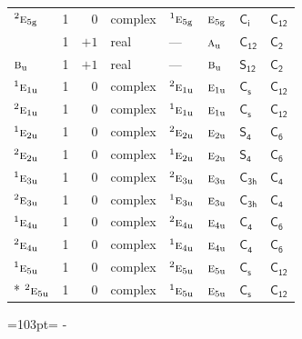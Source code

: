 \documentclass[10pt,a4paper]{article}
\newcommand{\needspace}[1]{\par\penalty-100\begingroup\dimen0=#1\relax\dimen2=\pagegoal
  \advance\dimen2-\pagetotal\ifdim\dimen0>\dimen2\relax\ifdim\dimen2>0pt\vfil\break\fi\fi
  \endgroup}
\numberwithin{equation}{section}
\newcommand{\grp}[1]{\mathsf{#1}}
\newcommand{\irr}[1]{\text{\normalfont\scshape #1}}
\newcommand{\conjpair}[1]{{}^{#1}}
\newcommand{\detbox}[1]{{\setlength{\fboxsep}{1pt}\fbox{#1}}}
\newcommand{\ptag}[1]{\mathrm{#1}}
\begin{document}
{\begin{longtable}{@{}lrrlllll@{}}
$\conjpair{2}\irr{e}_{5\ptag{g}}$ & 1 & $0$ & complex & $\conjpair{1}\irr{e}_{5\ptag{g}}$ & $\irr{e}_{5\ptag{g}}$ & \href{S2.pdf}{$\grp{C_{i}}$} & \href{C12.pdf}{$\grp{C_{12}}$}\\
\detbox{$\irr{a}_{\ptag{u}}$} & 1 & $+1$ & real & --- & $\irr{a}_{\ptag{u}}$ & \href{C12.pdf}{$\grp{C_{12}}$} & \href{C2.pdf}{$\grp{C_{2}}$}\\
$\irr{b}_{\ptag{u}}$ & 1 & $+1$ & real & --- & $\irr{b}_{\ptag{u}}$ & \href{S12.pdf}{$\grp{S_{12}}$} & \href{C2.pdf}{$\grp{C_{2}}$}\\
$\conjpair{1}\irr{e}_{1\ptag{u}}$ & 1 & $0$ & complex & $\conjpair{2}\irr{e}_{1\ptag{u}}$ & $\irr{e}_{1\ptag{u}}$ & \href{C1v.pdf}{$\grp{C_{s}}$} & \href{C12.pdf}{$\grp{C_{12}}$}\\
$\conjpair{2}\irr{e}_{1\ptag{u}}$ & 1 & $0$ & complex & $\conjpair{1}\irr{e}_{1\ptag{u}}$ & $\irr{e}_{1\ptag{u}}$ & \href{C1v.pdf}{$\grp{C_{s}}$} & \href{C12.pdf}{$\grp{C_{12}}$}\\
$\conjpair{1}\irr{e}_{2\ptag{u}}$ & 1 & $0$ & complex & $\conjpair{2}\irr{e}_{2\ptag{u}}$ & $\irr{e}_{2\ptag{u}}$ & \href{S4.pdf}{$\grp{S_{4}}$} & \href{C6.pdf}{$\grp{C_{6}}$}\\
$\conjpair{2}\irr{e}_{2\ptag{u}}$ & 1 & $0$ & complex & $\conjpair{1}\irr{e}_{2\ptag{u}}$ & $\irr{e}_{2\ptag{u}}$ & \href{S4.pdf}{$\grp{S_{4}}$} & \href{C6.pdf}{$\grp{C_{6}}$}\\
$\conjpair{1}\irr{e}_{3\ptag{u}}$ & 1 & $0$ & complex & $\conjpair{2}\irr{e}_{3\ptag{u}}$ & $\irr{e}_{3\ptag{u}}$ & \href{C3h.pdf}{$\grp{C_{3h}}$} & \href{C4.pdf}{$\grp{C_{4}}$}\\
$\conjpair{2}\irr{e}_{3\ptag{u}}$ & 1 & $0$ & complex & $\conjpair{1}\irr{e}_{3\ptag{u}}$ & $\irr{e}_{3\ptag{u}}$ & \href{C3h.pdf}{$\grp{C_{3h}}$} & \href{C4.pdf}{$\grp{C_{4}}$}\\
$\conjpair{1}\irr{e}_{4\ptag{u}}$ & 1 & $0$ & complex & $\conjpair{2}\irr{e}_{4\ptag{u}}$ & $\irr{e}_{4\ptag{u}}$ & \href{C4.pdf}{$\grp{C_{4}}$} & \href{C6.pdf}{$\grp{C_{6}}$}\\
$\conjpair{2}\irr{e}_{4\ptag{u}}$ & 1 & $0$ & complex & $\conjpair{1}\irr{e}_{4\ptag{u}}$ & $\irr{e}_{4\ptag{u}}$ & \href{C4.pdf}{$\grp{C_{4}}$} & \href{C6.pdf}{$\grp{C_{6}}$}\\
$\conjpair{1}\irr{e}_{5\ptag{u}}$ & 1 & $0$ & complex & $\conjpair{2}\irr{e}_{5\ptag{u}}$ & $\irr{e}_{5\ptag{u}}$ & \href{C1v.pdf}{$\grp{C_{s}}$} & \href{C12.pdf}{$\grp{C_{12}}$}\\*
$\conjpair{2}\irr{e}_{5\ptag{u}}$ & 1 & $0$ & complex & $\conjpair{1}\irr{e}_{5\ptag{u}}$ & $\irr{e}_{5\ptag{u}}$ & \href{C1v.pdf}{$\grp{C_{s}}$} & \href{C12.pdf}{$\grp{C_{12}}$}\\
\bottomrule\end{longtable}}
\needspace{103pt}
\end{document}
